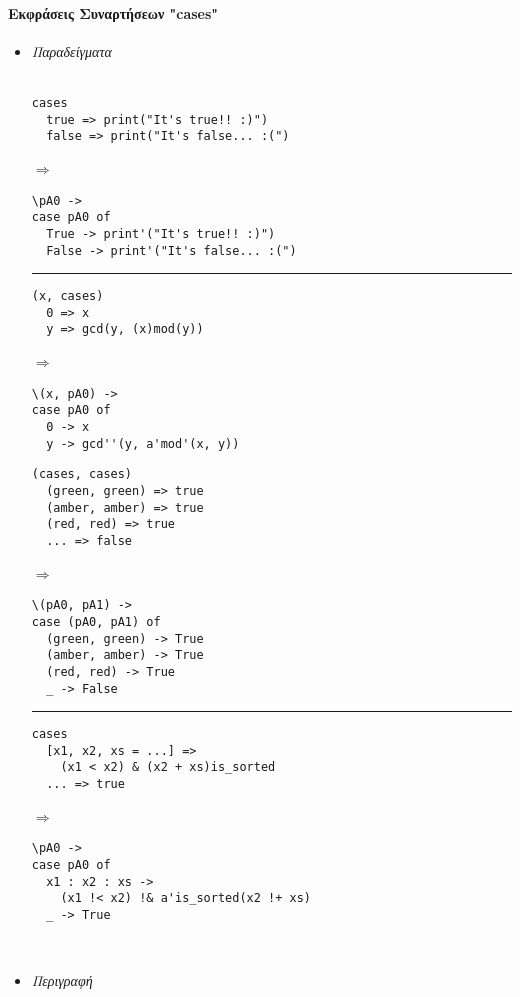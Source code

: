 \documentclass[diploma]{softlab-thesis}
\def\lra{$\Longrightarrow$\ }
\begin{document}
\newpage

\paragraph{Εκφράσεις Συναρτήσεων "cases"}

\begin{itemize}
\item
\textit{Παραδείγματα}\\\\
\begin{minipage}[t][13cm][t]{\linewidth}
\begin{minipage}{0.47\linewidth}

\begin{verbatim}
cases
  true => print("It's true!! :)")
  false => print("It's false... :(")
\end{verbatim}
\lra
\begin{verbatim}
\pA0 ->
case pA0 of
  True -> print'("It's true!! :)")
  False -> print'("It's false... :(")
\end{verbatim}

\rule{\linewidth}{0.1pt}

\begin{verbatim}
(x, cases)
  0 => x
  y => gcd(y, (x)mod(y))
\end{verbatim}
\lra
\begin{verbatim}
\(x, pA0) ->
case pA0 of
  0 -> x
  y -> gcd''(y, a'mod'(x, y))
\end{verbatim}
\end{minipage}
\hfill\vline\hfill
\begin{minipage}{0.45\linewidth}
\begin{verbatim}
(cases, cases)
  (green, green) => true
  (amber, amber) => true
  (red, red) => true
  ... => false
\end{verbatim}
\lra
\begin{verbatim}
\(pA0, pA1) ->
case (pA0, pA1) of
  (green, green) -> True
  (amber, amber) -> True
  (red, red) -> True
  _ -> False
\end{verbatim}

\rule{\linewidth}{0.1pt}

\begin{verbatim}
cases
  [x1, x2, xs = ...] =>
    (x1 < x2) & (x2 + xs)is_sorted
  ... => true
\end{verbatim}
\lra
\begin{verbatim}
\pA0 ->
case pA0 of
  x1 : x2 : xs ->
    (x1 !< x2) !& a'is_sorted(x2 !+ xs)
  _ -> True
\end{verbatim}
\end{minipage}
\end{minipage}
\\
\item
\textit{Περιγραφή}\\


\end{itemize}
\end{document}
